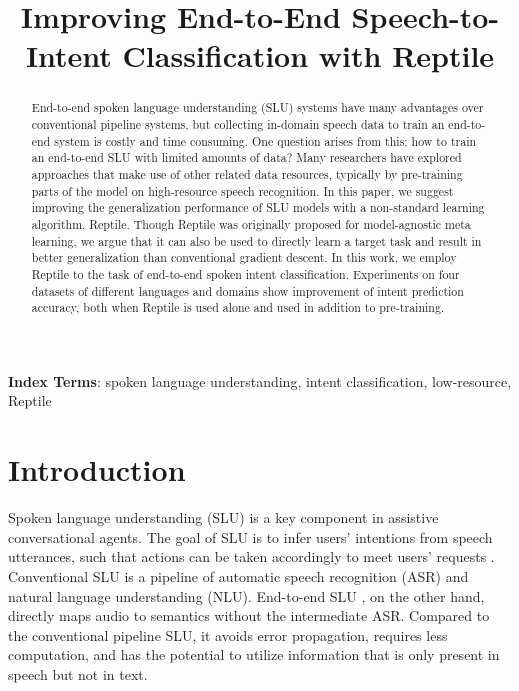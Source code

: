 \documentclass[a4paper]{article}
\title{Improving End-to-End Speech-to-Intent Classification with Reptile}
\begin{document}
	
	\maketitle
\begin{abstract}
		End-to-end spoken language understanding (SLU) systems have many advantages over conventional pipeline systems, but collecting in-domain speech data to train an end-to-end system is costly and time consuming. One question arises from this: how to train an end-to-end SLU with limited amounts of data? Many researchers have explored approaches that make use of other related data resources, typically by pre-training parts of the model on high-resource speech recognition. In this paper, we suggest improving the generalization performance of SLU models with a non-standard learning algorithm, Reptile. Though Reptile was originally proposed for model-agnostic meta learning, we argue that it can also be used to directly learn a target task and result in better generalization than conventional gradient descent. In this work, we employ Reptile to the task of end-to-end spoken intent classification. Experiments on four datasets of different languages and domains show improvement of intent prediction accuracy, both when Reptile is used alone and used in addition to pre-training. 
		
	\end{abstract}
	\noindent\textbf{Index Terms}: spoken language understanding, intent classification, low-resource, Reptile
	
	\section{Introduction}
	
	Spoken language understanding (SLU) is a key component in assistive conversational agents. The goal of SLU is to infer users’ intentions from speech utterances, such that actions can be taken accordingly to meet users’ requests \cite{wang2005spoken, tur2010left}. Conventional SLU is a pipeline of automatic speech recognition (ASR) and natural language understanding (NLU). End-to-end SLU \cite{1stend2end, serdyuk2018towards, haghani2018audio}, on the other hand, directly maps audio to semantics without the intermediate ASR. Compared to the conventional pipeline SLU, it avoids error propagation, requires less computation, and has the potential to utilize information that is only present in speech but not in text.
	
\end{document}
